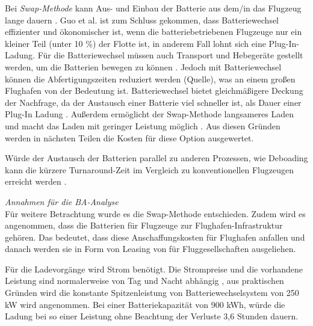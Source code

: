 Bei \textit{Swap-Methode} kann Aus- und Einbau der Batterie aus dem/in das Flugzeug lange dauern \cite{dalmia2022powering}. 
Guo et al. \cite{guo2020aviation} ist zum Schluss gekommen, dass Batteriewechsel effizienter und ökonomischer ist, 
wenn die batteriebetriebenen Flugzeuge nur ein kleiner Teil (unter 10 \%) der Flotte ist, in anderem Fall lohnt sich eine Plug-In-Ladung. 
Für die Batteriewechsel müssen auch Transport und Hebegeräte gestellt werden, um die Batterien bewegen zu können \cite{reimers2018introduction}.
Jedoch mit Batteriewechsel können die Abfertigungszeiten reduziert werden (Quelle), was an einem großen Flughafen von der Bedeutung ist. 
Batteriewechsel bietet gleichmäßigere Deckung der Nachfrage, 
da der Austausch einer Batterie viel schneller ist, als Dauer einer Plug-In Ladung \cite{guo2020aviation}. 
Außerdem ermöglicht der Swap-Methode langsameres Laden und macht das Laden mit geringer Leistung möglich \cite{avogadro2024demystifying}.
Aus diesen Gründen werden in nächsten Teilen die Kosten für diese Option ausgewertet. 

Würde der Austausch der Batterien parallel zu anderen Prozessen, wie Deboading kann die kürzere Turnaround-Zeit im 
Vergleich zu konventionellen Flugzeugen erreicht werden \cite{schmidt2016challenges}.

\textit{Annahmen für die BA-Analyse}\\

Für weitere Betrachtung wurde es die Swap-Methode entschieden. Zudem wird es angenommen, 
dass die Batterien für Flugzeuge zur Flughafen-Infrastruktur gehören.
Das bedeutet, dass diese Anschaffungskosten für Flughafen anfallen und danach werden sie in Form von Leasing 
von für Fluggesellschaften ausgeliehen.

Für die Ladevorgänge wird Strom benötigt. 
Die Strompreise und die vorhandene Leistung sind normalerweise von Tag und Nacht abhängig \cite{salucci2020optimal}, 
aus praktischen Gründen wird die konstante Spitzenleistung von Batteriewechselsystem von 250 kW wird angenommen. 
Bei einer Batteriekapazität von 900 kWh, würde die Ladung bei so einer Leistung ohne Beachtung der Verluste 3,6 Stunden dauern.

